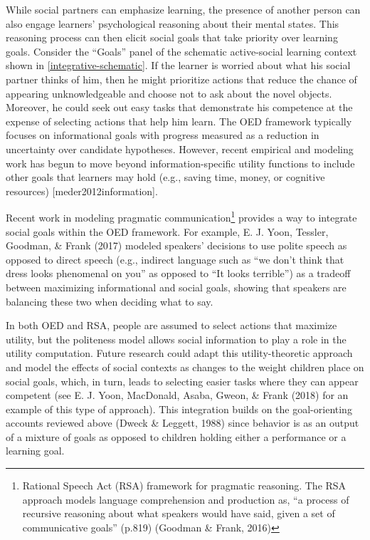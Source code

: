 \documentclass[oneside]{report}
\begin{document}
While social partners can emphasize learning, the presence of another
person can also engage learners' psychological reasoning about their
mental states. This reasoning process can then elicit social goals that
take priority over learning goals. Consider the ``Goals'' panel of the
schematic active-social learning context shown in
\ref{integrative-schematic}. If the learner is worried about what his
social partner thinks of him, then he might prioritize actions that
reduce the chance of appearing unknowledgeable and choose not to ask
about the novel objects. Moreover, he could seek out easy tasks that
demonstrate his competence at the expense of selecting actions that help
him learn. The OED framework typically focuses on informational goals
with progress measured as a reduction in uncertainty over candidate
hypotheses. However, recent empirical and modeling work has begun to
move beyond information-specific utility functions to include other
goals that learners may hold (e.g., saving time, money, or cognitive
resources) {[}meder2012information{]}.

Recent work in modeling pragmatic communication\footnote{Rational Speech
  Act (RSA) framework for pragmatic reasoning. The RSA approach models
  language comprehension and production as, ``a process of recursive
  reasoning about what speakers would have said, given a set of
  communicative goals'' (p.819) (Goodman \& Frank, 2016)} provides a way
to integrate social goals within the OED framework. For example, E. J.
Yoon, Tessler, Goodman, \& Frank (2017) modeled speakers' decisions to
use polite speech as opposed to direct speech (e.g., indirect language
such as ``we don't think that dress looks phenomenal on you'' as opposed
to ``It looks terrible'') as a tradeoff between maximizing informational
and social goals, showing that speakers are balancing these two when
deciding what to say.

In both OED and RSA, people are assumed to select actions that maximize
utility, but the politeness model allows social information to play a
role in the utility computation. Future research could adapt this
utility-theoretic approach and model the effects of social contexts as
changes to the weight children place on social goals, which, in turn,
leads to selecting easier tasks where they can appear competent (see E.
J. Yoon, MacDonald, Asaba, Gweon, \& Frank (2018) for an example of this
type of approach). This integration builds on the goal-orienting
accounts reviewed above (Dweck \& Leggett, 1988) since behavior is as an
output of a mixture of goals as opposed to children holding either a
performance or a learning goal.
\end{document}
